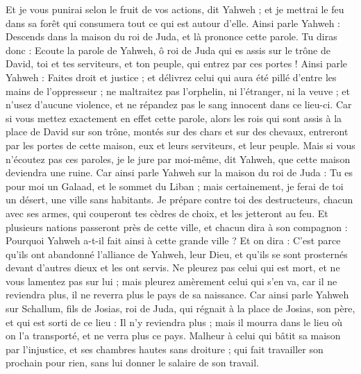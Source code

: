 \begin{multicols}{2}
Et je vous punirai selon le fruit de vos actions, dit Yahweh ; et je mettrai le feu dans sa forêt qui consumera tout ce qui est autour d'elle.
\VerseOne{}Ainsi parle Yahweh : Descends dans la maison du roi de Juda, et là prononce cette parole.
Tu diras donc : Ecoute la parole de Yahweh, ô roi de Juda qui es assis sur le trône de David, toi et tes serviteurs, et ton peuple, qui entrez par ces portes !
Ainsi parle Yahweh : Faites droit et justice ; et délivrez celui qui aura été pillé d'entre les mains de l'oppresseur ; ne maltraitez pas l'orphelin, ni l'étranger, ni la veuve ; et n'usez d'aucune violence, et ne répandez pas le sang innocent dans ce lieu-ci.
Car si vous mettez exactement en effet cette parole, alors les rois qui sont assis à la place de David sur son trône, montés sur des chars et sur des chevaux, entreront par les portes de cette maison, eux et leurs serviteurs, et leur peuple.
Mais si vous n'écoutez pas ces paroles, je le jure par moi-même, dit Yahweh, que cette maison deviendra une ruine.
Car ainsi parle Yahweh sur la maison du roi de Juda : Tu es pour moi un Galaad, et le sommet du Liban ; mais certainement, je ferai de toi un désert, une ville sans habitants.
Je prépare contre toi des destructeurs, chacun avec ses armes, qui couperont tes cèdres de choix, et les jetteront au feu.
Et plusieurs nations passeront près de cette ville, et chacun dira à son compagnon : Pourquoi Yahweh a-t-il fait ainsi à cette grande ville ?
Et on dira : C'est parce qu'ils ont abandonné l'alliance de Yahweh, leur Dieu, et qu'ils se sont prosternés devant d'autres dieux et les ont servis.
Ne pleurez pas celui qui est mort, et ne vous lamentez pas sur lui ; mais pleurez amèrement celui qui s'en va, car il ne reviendra plus, il ne reverra plus le pays de sa naissance.
Car ainsi parle Yahweh sur Schallum, fils de Josias, roi de Juda, qui régnait à la place de Josias, son père, et qui est sorti de ce lieu : Il n'y reviendra plus ;
mais il mourra dans le lieu où on l'a transporté, et ne verra plus ce pays.
Malheur à celui qui bâtit sa maison par l'injustice, et ses chambres hautes sans droiture ; qui fait travailler son prochain pour rien, sans lui donner le salaire de son travail.

\end{multicols}

